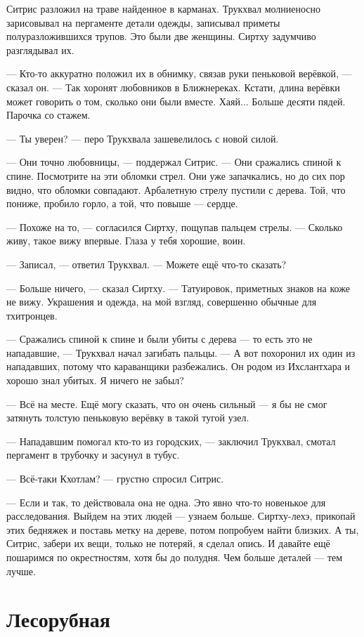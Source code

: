 Ситрис разложил на траве найденное в карманах.
Трукхвал молниеносно зарисовывал на пергаменте детали одежды, записывал приметы полуразложившихся трупов.
Это были две женщины.
Сиртху задумчиво разглядывал их.

--- Кто-то аккуратно положил их в обнимку, связав руки пеньковой верёвкой, --- сказал он.
--- Так хоронят любовников в Ближнереках.
Кстати, длина верёвки может говорить о том, сколько они были вместе.
Хаяй...
Больше десяти пядей.
Парочка со стажем.

--- Ты уверен? --- перо Трукхвала зашевелилось с новой силой.

--- Они точно любовницы, --- поддержал Ситрис.
--- Они сражались спиной к спине.
Посмотрите на эти обломки стрел.
Они уже запачкались, но до сих пор видно, что обломки совпадают.
Арбалетную стрелу пустили с дерева.
Той, что пониже, пробило горло, а той, что повыше --- сердце.

--- Похоже на то, --- согласился Сиртху, пощупав пальцем стрелы.
--- Сколько живу, такое вижу впервые.
Глаза у тебя хорошие, воин.

--- Записал, --- ответил Трукхвал.
--- Можете ещё что-то сказать?

--- Больше ничего, --- сказал Сиртху.
--- Татуировок, приметных знаков на коже не вижу.
Украшения и одежда, на мой взгляд, совершенно обычные для тхитронцев.

--- Сражались спиной к спине и были убиты с дерева --- то есть это не нападавшие, --- Трукхвал начал загибать пальцы.
--- А вот похоронил их один из нападавших, потому что караванщики разбежались.
Он родом из Ихслантхара и хорошо знал убитых.
Я ничего не забыл?

--- Всё на месте.
Ещё могу сказать, что он очень сильный --- я бы не смог затянуть толстую пеньковую верёвку в такой тугой узел.

--- Нападавшим помогал кто-то из городских, --- заключил Трукхвал, смотал пергамент в трубочку и засунул в тубус.

--- Всё-таки Кхотлам? --- грустно спросил Ситрис.

--- Если и так, то действовала она не одна.
Это явно что-то новенькое для расследования.
Выйдем на этих людей --- узнаем больше.
Сиртху-лехэ, прикопай этих бедняжек и поставь метку на дереве, потом попробуем найти близких.
А ты, Ситрис, забери их вещи, только не потеряй, я сделал опись.
И давайте ещё пошаримся по окрестностям, хотя бы до полудня.
Чем больше деталей --- тем лучше.

\section{Лесорубная}

